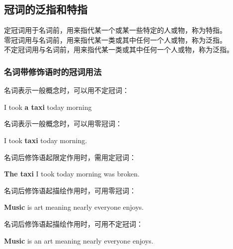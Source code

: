 \documentclass[UTF8]{ctexart}
\begin{document}
\newpage

\subsection{冠词的泛指和特指}
    定冠词用于名词前，用来指代某一个或某一些特定的人或物，称为特指。\\[3mm]
    零冠词用与名词前，用来指代某一类或其中任何一个人或物，称为泛指。\\[3mm]
    不定冠词用与名词前，用来指代某一类或其中任何一个人或物，称为泛指。

\subsubsection{名词带修饰语时的冠词用法}
    名词表示一般概念时，可以用不定冠词：
    \begin{center}
        \large\ttfamily
        I took \textbf{a taxi} today morning\\[4mm]
    \end{center}
    名词表示一般概念时，可以用零冠词：
    \begin{center}
        \large\ttfamily
        I took \textbf{taxi} today morning.\\[4mm]
    \end{center}
    名词后修饰语起限定作用时，需用定冠词：
    \begin{center}
        \large\ttfamily
        \textbf{The taxi} I took today morning was broken.\\[4mm]
    \end{center}
    名词后修饰语起描绘作用时，可用零冠词：
    \begin{center}
        \large\ttfamily
        \textbf{Music} is art meaning nearly everyone enjoys.\\[4mm]
    \end{center}
    名词后修饰语起描绘作用时，可用不定冠词：
    \begin{center}
        \large\ttfamily
        \textbf{Music} is an art meaning nearly everyone enjoys.
    \end{center}
\end{document}
